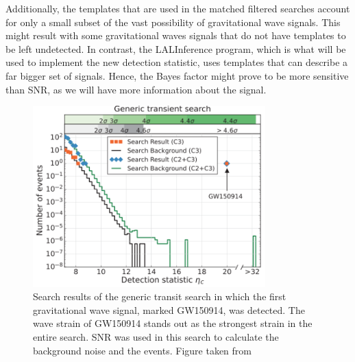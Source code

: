 \documentclass{article}
\begin{document}
  
  Additionally, the templates that are used in the matched filtered searches account for only a small subset of the vast possibility of gravitational wave signals. This might result with some gravitational waves signals that do not have templates to be left undetected.  In contrast, the LALInference program, which is what will be used to implement the new detection statistic, uses templates that can describe a far bigger set of signals. Hence, the Bayes factor might prove to be more sensitive than SNR, as we will have more information about the signal.
  
  
  
\begin{figure}[h]
	\centering
	\includegraphics[width=0.8\textwidth]{Figures/DetectionInGenericTransientSearch}
	\caption{Search results of the generic transit search in which the first gravitational wave signal, marked GW150914, was detected. The wave strain of GW150914 stands out as the strongest strain in the entire search. SNR was used in this search to calculate the background noise and the events. Figure taken from \cite{DetectionPaper}}
	 \label{Fig:Detection}
\end{figure}

 
 
  
  
\end{document}
